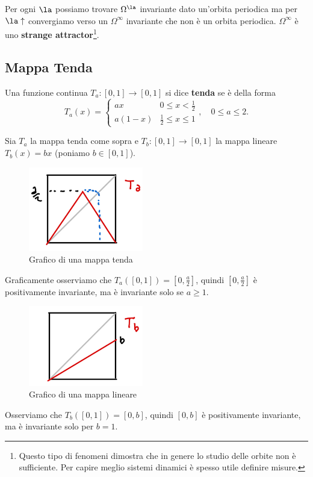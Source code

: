 Per ogni $\la$ possiamo trovare $\Omega^\la$ invariante dato un'orbita periodica ma per $\la\uparrow$ convergiamo verso un $\Omega^\infty$ invariante che non \`e un orbita periodica. $\Omega^\infty$ \`e uno \textbf{strange attractor}\footnote{Questo tipo di fenomeni dimostra che in genere lo studio delle orbite non \`e sufficiente. Per capire meglio sistemi dinamici \`e spesso utile definire misure.}.



\subsection{Mappa Tenda}

\begin{definition}
Una funzione continua $T_a:[0,1]\to[0,1]$ si dice \textbf{tenda} se \`e della forma
\[T_a(x)=\begin{cases}
ax & 0\leq x< \frac12\\
a(1-x) & \frac12\leq x\leq 1
\end{cases},\quad 0\leq a\leq 2.\]
\end{definition}

\begin{example}
Sia $T_a$ la mappa tenda come sopra e $T_b:[0,1]\to [0,1]$ la mappa lineare $T_b(x)=bx$ (poniamo $b\in [0,1]$).
\begin{figure}[!htb]
    \centering
    \includegraphics[width=5cm]{Immagini/Insieme_invariante_tenda.png}
    \caption{Grafico di una mappa tenda}
\end{figure}
Graficamente osserviamo che $T_a([0,1])=[0,\frac a2]$, quindi $[0,\frac a2]$ \`e positivamente invariante, ma \`e invariante solo se $a\geq 1$.
\begin{figure}[!htb]
    \centering
    \includegraphics[width=5cm]{Immagini/Insieme_invariante_lineare.png}
    \caption{Grafico di una mappa lineare}
\end{figure}
Osserviamo che $T_b([0,1])=[0,b]$, quindi $[0,b]$ \`e positivamente invariante, ma \`e invariante solo per $b=1$.
\end{example}

